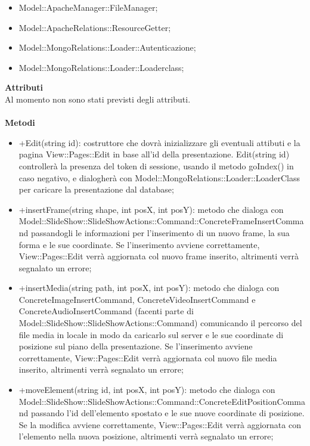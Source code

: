 {{\begin{itemize}
\begin{itemize}
							\item Invoker;
						\end{itemize}
						\item Model::ApacheManager::FileManager;
						\item Model::ApacheRelations::ResourceGetter;
						\item Model::MongoRelations::Loader::Autenticazione;
						\item Model::MongoRelations::Loader::Loaderclass;
					\end{itemize}
					\textbf{Attributi}\\
					\indent Al momento non sono stati previsti degli attributi.\\\\
					\textbf{Metodi}
					\begin{itemize}
						\item +Edit(string id):  costruttore che dovrà inizializzare gli eventuali attibuti e la pagina View::Pages::Edit in base all'id della presentazione. Edit(string id) controllerà la presenza del token di sessione, usando il metodo goIndex() in caso negativo, e dialogherà con Model::MongoRelations::Loader::LoaderClass per caricare la presentazione dal database;
						\item +insertFrame(string shape, int posX, int posY): metodo che dialoga con Model::SlideShow::SlideShowActions::Command::ConcreteFrameInsertCommand passandogli le informazioni per l'inserimento di un nuovo frame, la sua forma e le sue coordinate. Se l'inserimento avviene correttamente, View::Pages::Edit verrà aggiornata col nuovo frame inserito, altrimenti verrà segnalato un errore;
						\item +insertMedia(string path, int posX, int posY): metodo che dialoga con ConcreteImageInsertCommand, ConcreteVideoInsertCommand e ConcreteAudioInsertCommand (facenti parte di Model::SlideShow::SlideShowActions::Command) comunicando il percorso del file media in locale in modo da caricarlo sul server e le sue coordinate di posizione sul piano della presentazione. Se l'inserimento avviene correttamente, View::Pages::Edit verrà aggiornata col nuovo file media inserito, altrimenti verrà segnalato un errore;
						\item +moveElement(string id, int posX, int posY): metodo che dialoga con Model::SlideShow::SlideShowActions::Command::ConcreteEditPositionCommand passando l'id dell'elemento spostato e le sue nuove coordinate di posizione. Se la modifica avviene correttamente, View::Pages::Edit verrà aggiornata con l'elemento nella nuova posizione, altrimenti verrà segnalato un errore;

\end{itemize}}}
